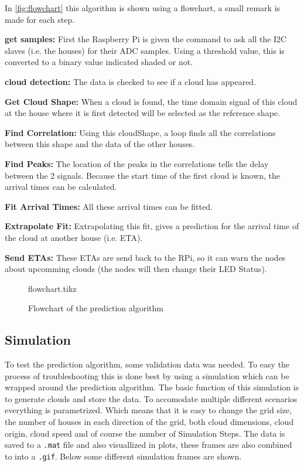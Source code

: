 \documentclass[a4paper,journal]{DDREAM}
\newcommand{\paragraphC}[1]{{\bfseries #1: }} %
\begin{document}
In \autoref{fig:flowchart} this algorithm is shown using a flowchart, a small remark is made for each step.

\paragraphC{get samples} First the Raspberry Pi is given the command to ask all the I2C slaves (i.e. the houses) for their ADC samples.
Using a threshold value, this is converted to a binary value indicated shaded or not.

\paragraphC{cloud detection} The data is checked to see if a cloud has appeared.

\paragraphC{Get Cloud Shape} When a cloud is found, the time domain signal of this cloud at the house where it is first detected will be selected as the reference shape.

\paragraphC{Find Correlation} Using this cloudShape, a loop finds all the correlations between this shape and the data of the other houses.

\paragraphC{Find Peaks} The location of the peaks in the correlations tells the delay between the 2 signals.
Because the start time of the first cloud is known, the arrival times can be calculated.

\paragraphC{Fit Arrival Times} All these arrival times can be fitted.

\paragraphC{Extrapolate Fit} Extrapolating this fit, gives a prediction for the arrival time of the cloud at another house (i.e. ETA).

\paragraphC{Send ETAs} These ETAs are send back to the RPi, so it can warn the nodes about upcomming clouds (the nodes will then change their LED Status).

\begin{figure}[H]
\centering
    {flowchart.tikz}
    \caption{Flowchart of the prediction algorithm}
    \label{fig:flowchart}
\end{figure}

\subsection{Simulation}\label{sec:implementation-simulation}
To test the prediction algorithm, some validation data was needed.
To easy the process of troubleshooting this is done best by using a simulation which can be wrapped around the prediction algorithm.
The basic function of this simulation is to generate clouds and store the data.
To accomodate multiple different scenarios everything is parametrized.
Which means that it is easy to change the grid size, the number of houses in each direction of the grid, both cloud dimensions, cloud origin, cloud speed and of course the number of Simulation Steps.
The data is saved to a \texttt{.mat} file and also visuallized in plots, these frames are also combined to into a \texttt{.gif}.
Below some different simulation frames are shown.
\end{document}
